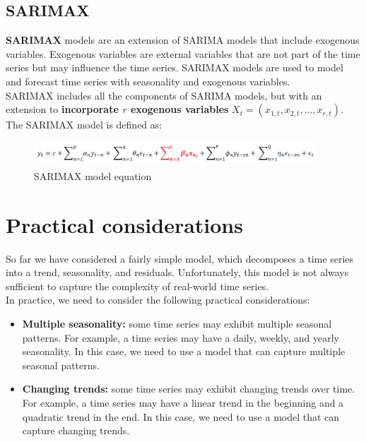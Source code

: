 \subsection{SARIMAX}

\textbf{SARIMAX} models are an extension of SARIMA models that include exogenous variables.
Exogenous variables are external variables that are not part of the time series but may
influence the time series. SARIMAX models are used to model and forecast time series with
seasonality and exogenous variables.\\

SARIMAX includes all the components of SARIMA models, but with an extension to \textbf{incorporate
$r$ exogenous variables} $X_t = (x_{1,t}, x_{2,t}, ..., x_{r,t})$. The SARIMAX model is defined as:

\begin{figure}[H]
    \centering
    \includegraphics[width=0.95\textwidth]{figures/sarimax.png}
    \caption{SARIMAX model equation}
    \label{fig:sarimax_eq}
\end{figure}

\section{Practical considerations}

So far we have considered a fairly simple model, which decomposes a time series into
a trend, seasonality, and residuals. Unfortunately, this model is not always sufficient
to capture the complexity of real-world time series.\\

In practice, we need to consider the following practical considerations:

\begin{itemize}
    \item \textbf{Multiple seasonality:} some time series may exhibit multiple seasonal
    patterns. For example, a time series may have a daily, weekly, and yearly seasonality.
    In this case, we need to use a model that can capture multiple seasonal patterns.

    \item \textbf{Changing trends:} some time series may exhibit changing trends over time.
    For example, a time series may have a linear trend in the beginning and a quadratic
    trend in the end. In this case, we need to use a model that can capture changing trends.
\end{itemize}

